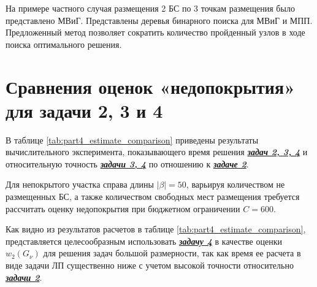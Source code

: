 На примере частного случая размещения 2 БС по 3 точкам размещения было представлено МВиГ. Представлены деревья бинарного поиска для МВиГ и МПП. Предложенный метод позволяет сократить количество пройденный узлов в ходе поиска оптимального решения. 







\FloatBarrier
\section{Сравнения оценок «недопокрытия» для задачи 2, 3 и 4}\label{part4:task_234}

В таблице \cref{tab:part4_estimate_comparison} приведены результаты вычислительного эксперимента, показывающего время решения \underline{\textit{\textbf{задач 2, 3, 4}}} и относительную точность \underline{\textit{\textbf{задачи 3, 4}}} по отношению к \underline{\textit{\textbf{задаче 2}}}.

Для непокрытого участка справа длины $|\beta| = 50$, варьируя количеством не размещенных БС, а также количеством свободных мест размещения требуется рассчитать оценку недопокрытия при бюджетном ограничении $C=600$.


Как видно из результатов расчетов в таблице \cref{tab:part4_estimate_comparison}, представляется целесообразным  использовать  \underline{\textit{\textbf{задачу 4}}} в качестве оценки $w_2 (G_\nu )$ для решения задач большой размерности, так как время ее расчета в виде задачи ЛП существенно ниже с учетом высокой точности относительно \underline{\textit{\textbf{задачи 2}}}.


